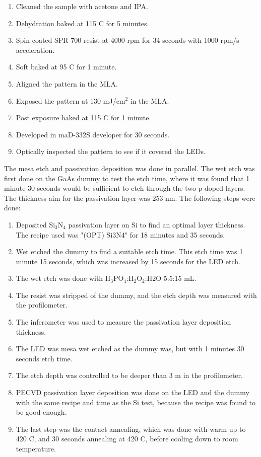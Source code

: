 \begin{enumerate}
    \item Cleaned the sample with acetone and IPA.
    \item Dehydration baked at 115 \textdegree C for 5 minutes.
    \item Spin coated SPR 700 resist at 4000 rpm for 34 seconds with 1000 rpm/s acceleration.
    \item Soft baked at 95 \textdegree C for 1 minute.
    \item Aligned the pattern in the MLA.
    \item Exposed the pattern at 130 mJ/cm$^2$ in the MLA.
    \item Post exposure baked at 115 \textdegree C for 1 minute.
    \item Developed in maD-332S developer for 30 seconds.
    \item Optically inspected the pattern to see if it covered the LEDs.
\end{enumerate}

The mesa etch and passivation deposition was done in parallel.
The wet etch was first done on the GaAs dummy to test the etch time, where it was found that 1 minute 30 seconds would be sufficient to etch through the two p-doped layers.
The thickness aim for the passivation layer was 253 nm. 
The following steps were done:

\begin{enumerate}
    \item Deposited Si$_3$N$_4$ passivation layer on Si to find an optimal layer thickness. The recipe used was "(OPT) Si3N4" for 18 minutes and 35 seconds.
    \item Wet etched the dummy to find a suitable etch time. This etch time was 1 minute 15 seconds, which was increased by 15 seconds for the LED etch.
    \item The wet etch was done with H$_3$PO$_4$:H$_2$O$_2$:H$2$O 5:5:15 mL.
    \item The resist was stripped of the dummy, and the etch depth was measured with the profilometer.
    \item The inferometer was used to measure the passivation layer deposition thickness.
    \item The LED was mesa wet etched as the dummy was, but with 1 minutes 30 seconds etch time.
    \item The etch depth was controlled to be deeper than 3 \textmu m in the profilometer.
    \item PECVD passivation layer deposition was done on the LED and the dummy with the same recipe and time as the Si test, because the recipe was found to be good enough.
    \item The last step was the contact annealing, which was done with warm up to 420 \textdegree C, and 30 seconds annealing at 420 \textdegree C, before cooling down to room temperature.
\end{enumerate}



